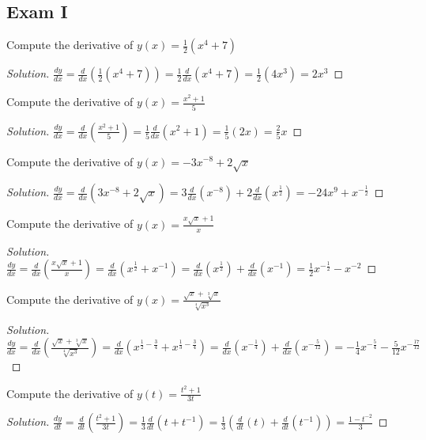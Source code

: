 \documentclass[crop=false,class=book,oneside]{standalone}
\begin{document}
\subsection{Exam I}
\begin{problem}
Compute the derivative of $y(x)=\frac{1}{2}(x^{4}+7)$
\end{problem}
\begin{proof}[Solution]
$\frac{dy}{dx}=\frac{d}{dx}(\frac{1}{2}(x^{4}+7))=\frac{1}{2}\frac{d}{dx}(x^{4}+7)=\frac{1}{2}(4x^{3})=2x^{3}$
\end{proof}
\begin{problem}
Compute the derivative of $y(x)=\frac{x^{2}+1}{5}$
\end{problem}
\begin{proof}[Solution]
$\frac{dy}{dx}=\frac{d}{dx}(\frac{x^{2}+1}{5})=\frac{1}{5}\frac{d}{dx}(x^{2}+1)=\frac{1}{5}(2x)=\frac{2}{5}x$
\end{proof}
\begin{problem}
Compute the derivative of $y(x)=-3x^{-8}+2\sqrt{x}$
\end{problem}
\begin{proof}[Solution]
$\frac{dy}{dx}=\frac{d}{dx}(3x^{-8}+2\sqrt{x})=3\frac{d}{dx}(x^{-8})+2\frac{d}{dx}(x^{\frac{1}{2}})=-24x^{9}+x^{-\frac{1}{2}}$
\end{proof}
\begin{problem}
Compute the derivative of $y(x)=\frac{x\sqrt{x}+1}{x}$
\end{problem}
\begin{proof}[Solution]
$\frac{dy}{dx}=\frac{d}{dx}(\frac{x\sqrt{x}+1}{x})=\frac{d}{dx}(x^{\frac{1}{2}}+x^{-1})=\frac{d}{dx}(x^{\frac{1}{2}})+\frac{d}{dx}(x^{-1})=\frac{1}{2}x^{-\frac{1}{2}}-x^{-2}$
\end{proof}
\begin{problem}
Compute the derivative of $y(x)=\frac{\sqrt{x}+\sqrt[3]{x}}{\sqrt[4]{x^{3}}}$
\end{problem}
\begin{proof}[Solution]
$\frac{dy}{dx}=\frac{d}{dx}(\frac{\sqrt{x}+\sqrt[3]{x}}{\sqrt[4]{x^{3}}})=\frac{d}{dx}(x^{\frac{1}{2}-\frac{3}{4}}+x^{\frac{1}{3}-\frac{3}{4}})=\frac{d}{dx}(x^{-\frac{1}{4}})+\frac{d}{dx}(x^{-\frac{5}{12}})=-\frac{1}{4}x^{-\frac{5}{4}}-\frac{5}{12}x^{-\frac{17}{12}}$
\end{proof}
\begin{problem}
Compute the derivative of $y(t)=\frac{t^{2}+1}{3t}$
\end{problem}
\begin{proof}[Solution]
$\frac{dy}{dt}=\frac{d}{dt}(\frac{t^{2}+1}{3t})=\frac{1}{3}\frac{d}{dt}(t+t^{-1})=\frac{1}{3}(\frac{d}{dt}(t)+\frac{d}{dt}(t^{-1}))=\frac{1-t^{-2}}{3}$
\end{proof}
\end{document}
